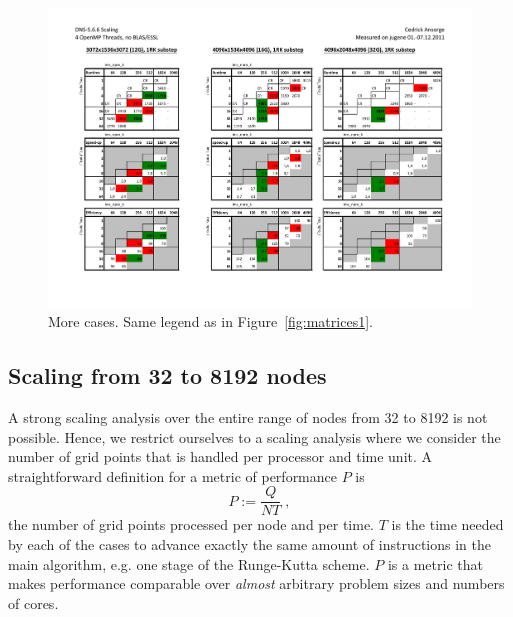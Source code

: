 \begin{figure}
\begin{centering}
\includegraphics[height=0.9\textwidth,angle=90]{figs/matrices_2.pdf}
\caption{More cases. Same legend as in Figure~\ref{fig:matrices1}.}
\label{fig:matrices2}
\end{centering}
\end{figure}

\subsection{Scaling from 32 to 8192 nodes} 

A strong scaling analysis over the entire range of nodes from 32 to 8192 is not
possible. Hence, we restrict ourselves to a scaling analysis where we consider
the number of grid points that is handled per processor and time unit. A
straightforward definition for a metric of performance $P$ is
\begin{equation}
  P:=\frac{Q}{N T} \;,
\end{equation}
the number of grid points processed per node and per time. $T$ is the time
needed by each of the cases to advance exactly the same amount of instructions
in the main algorithm, e.g. one stage of the Runge-Kutta scheme. $P$ is a metric
that makes performance comparable over \textit{almost} arbitrary problem sizes
and numbers of cores.

